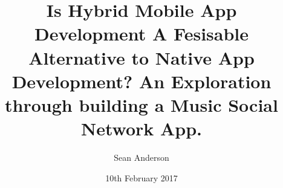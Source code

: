 
\title{Is Hybrid Mobile App Development A Fesisable Alternative to Native App Development? An Exploration through building a Music Social Network App.}

\author{Sean Anderson}




\date{10th February 2017} %




\maketitle




